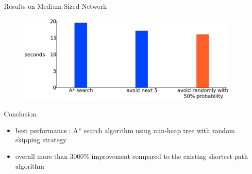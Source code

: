 \documentclass[final]{beamer}
\begin{document}
\begin{frame}{ }
\begin{columns}[t]
\begin{column}{.28\linewidth}
\begin{block}{Results on Medium Sized Network}
\begin{figure}
                    \includegraphics[width=\linewidth]{img/random_runtime}
                \end{figure}
            \end{block}
            \begin{block}{Conclusion}
                \begin{itemize}
                    \itemsep.5em
                    \item \alert{best performance} : A* search algorithm using min-heap tree with random skipping strategy
                    \item overall more than \alert{3000\% improvement} compared to the existing shortest path algorithm
                \end{itemize}
            \end{block}
        \end{column}
    \end{columns}
\end{frame}
\end{document}
